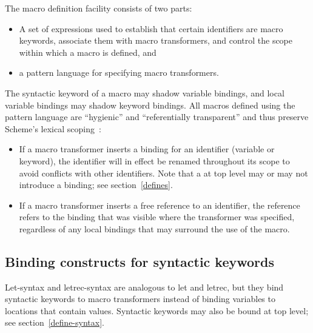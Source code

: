 The macro definition facility consists of two parts:

\begin{itemize}
\item A set of expressions used to establish that certain identifiers
are macro keywords, associate them with macro transformers, and control
the scope within which a macro is defined, and

\item a pattern language for specifying macro transformers.
\end{itemize}

The syntactic keyword of a macro may shadow variable bindings, and local
variable bindings may shadow keyword bindings.    All macros
defined using the pattern language  are ``hygienic'' and ``referentially
transparent'' and thus preserve Scheme's lexical scoping~\cite{Kohlbecker86,
hygienic,Bawden88,macrosthatwork,syntacticabstraction}:


\begin{itemize}

\item If a macro transformer inserts a binding for an identifier
(variable or keyword), the identifier will in effect be renamed
throughout its scope to avoid conflicts with other identifiers.
Note that a  at top level may or may not introduce a binding;
see section~\ref{defines}.

\item If a macro transformer inserts a free reference to an
identifier, the reference refers to the binding that was visible
where the transformer was specified, regardless of any local
bindings that may surround the use of the macro.

\end{itemize}



\subsection{Binding constructs for syntactic keywords}
\label{bindsyntax}

{\cf Let-syntax} and {\cf letrec-syntax} are
analogous to {\cf let} and {\cf letrec}, but they bind
syntactic keywords to macro transformers instead of binding variables
to locations that contain values.  Syntactic keywords may also be
bound at top level; see section~\ref{define-syntax}.

